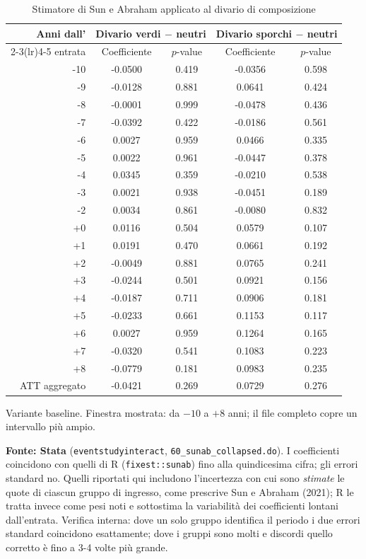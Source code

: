 \begin{table}[htbp]
\centering
\footnotesize
\caption{Stimatore di Sun e Abraham applicato al divario di composizione}
\label{tab:sunab}
\begin{threeparttable}
\begin{tabular}{rcccc}
\toprule
Anni dall' & \multicolumn{2}{c}{Divario verdi $-$ neutri} & \multicolumn{2}{c}{Divario sporchi $-$ neutri} \\
\cmidrule(lr){2-3}\cmidrule(lr){4-5}
entrata & Coefficiente & $p$-value & Coefficiente & $p$-value \\
\midrule
-10 & -0.0500 & 0.419 & -0.0356 & 0.598 \\
-9 & -0.0128 & 0.881 & 0.0641 & 0.424 \\
-8 & -0.0001 & 0.999 & -0.0478 & 0.436 \\
-7 & -0.0392 & 0.422 & -0.0186 & 0.561 \\
-6 & 0.0027 & 0.959 & 0.0466 & 0.335 \\
-5 & 0.0022 & 0.961 & -0.0447 & 0.378 \\
-4 & 0.0345 & 0.359 & -0.0210 & 0.538 \\
-3 & 0.0021 & 0.938 & -0.0451 & 0.189 \\
-2 & 0.0034 & 0.861 & -0.0080 & 0.832 \\
+0 & 0.0116 & 0.504 & 0.0579 & 0.107 \\
+1 & 0.0191 & 0.470 & 0.0661 & 0.192 \\
+2 & -0.0049 & 0.881 & 0.0765 & 0.241 \\
+3 & -0.0244 & 0.501 & 0.0921 & 0.156 \\
+4 & -0.0187 & 0.711 & 0.0906 & 0.181 \\
+5 & -0.0233 & 0.661 & 0.1153 & 0.117 \\
+6 & 0.0027 & 0.959 & 0.1264 & 0.165 \\
+7 & -0.0320 & 0.541 & 0.1083 & 0.223 \\
+8 & -0.0779 & 0.181 & 0.0983 & 0.235 \\
\midrule
ATT aggregato & -0.0421 & 0.269 & 0.0729 & 0.276 \\
\bottomrule
\end{tabular}
\begin{tablenotes}[flushleft]\footnotesize
\item Variante baseline. Finestra mostrata: da $-10$ a $+8$ anni; il file completo copre un intervallo pi\`u ampio.
\item \textbf{Fonte: Stata} (\texttt{eventstudyinteract}, \texttt{60\_sunab\_collapsed.do}). I coefficienti coincidono con quelli di R (\texttt{fixest::sunab}) fino alla quindicesima cifra; gli errori standard no. Quelli riportati qui includono l'incertezza con cui sono \emph{stimate} le quote di ciascun gruppo di ingresso, come prescrive Sun e Abraham (2021); R le tratta invece come pesi noti e sottostima la variabilit\`a dei coefficienti lontani dall'entrata. Verifica interna: dove un solo gruppo identifica il periodo i due errori standard coincidono esattamente; dove i gruppi sono molti e discordi quello corretto \`e fino a 3-4 volte pi\`u grande.

\end{tablenotes}
\end{threeparttable}
\end{table}
